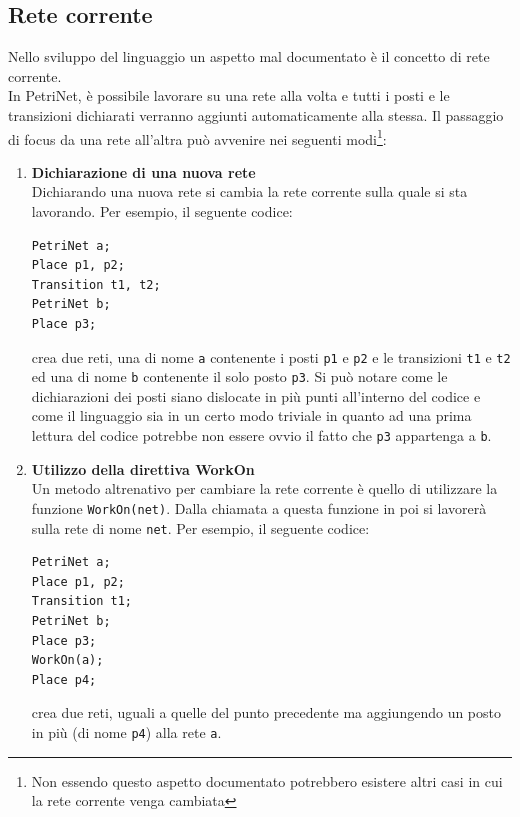 \documentclass[italian,12pt]{book}
\begin{document}
\subsection{Rete corrente}\label{ssect:Rete_corrente_old}
Nello sviluppo del linguaggio un aspetto mal documentato è il concetto di rete corrente.\\
In PetriNet, è possibile lavorare su una rete alla volta e tutti i posti e le transizioni dichiarati 
verranno aggiunti automaticamente alla stessa. Il passaggio di focus da una rete all'altra 
può avvenire nei seguenti modi\footnote{Non essendo questo aspetto documentato potrebbero esistere 
altri casi in cui la rete corrente venga cambiata}:
\begin{enumerate}
  \item {\bf Dichiarazione di una nuova rete}\\
    Dichiarando una nuova rete si cambia la rete corrente sulla quale si sta lavorando.
    Per esempio, il seguente codice: 
\begin{verbatim}PetriNet a;
Place p1, p2;
Transition t1, t2;
PetriNet b;
Place p3;
\end{verbatim}
    crea due reti, una di nome {\tt a} contenente i posti {\tt p1} e {\tt p2} e le transizioni
    {\tt t1} e {\tt t2} ed una di nome {\tt b} contenente il solo posto {\tt p3}.
    Si può notare come le dichiarazioni dei posti siano dislocate in più punti all'interno del codice
    e come il linguaggio sia in un certo modo triviale in quanto ad una prima lettura del codice potrebbe
    non essere ovvio il fatto che {\tt p3} appartenga a {\tt b}.
  \item {\bf Utilizzo della direttiva WorkOn}\\
    Un metodo altrenativo per cambiare la rete corrente è quello di utilizzare la funzione 
    {\tt WorkOn(net)}. Dalla chiamata a questa funzione in poi si lavorerà sulla rete
    di nome {\tt net}.
    Per esempio, il seguente codice:
\begin{verbatim}PetriNet a;
Place p1, p2;
Transition t1;
PetriNet b;
Place p3;
WorkOn(a);
Place p4;
\end{verbatim}
    crea due reti, uguali a quelle del punto precedente ma aggiungendo un posto in più (di nome {\tt p4})
    alla rete {\tt a}.
\end{enumerate}
\end{document}
